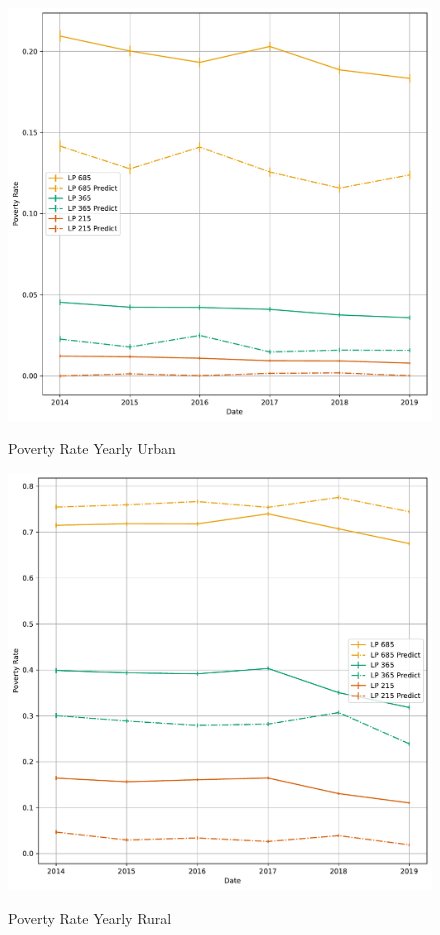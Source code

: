\begin{figure}[H]
    \centering
    \caption{Poverty Rate Yearly Urban}
    \includegraphics[width=\textwidth]{../figures/fig8a_poverty_rate_time_series_urbano.pdf}
    \label{fig:enter-label}
\end{figure}


\begin{figure}[H]
    \centering
    \caption{Poverty Rate Yearly Rural}
    \includegraphics[width=\textwidth]{../figures/fig8b_poverty_rate_time_series_rural.pdf}
    \label{fig:enter-label}
\end{figure}


